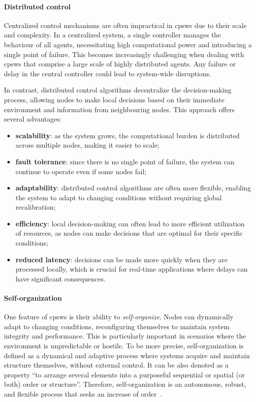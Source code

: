 \paragraph*{Distributed control}
Centralized control mechanisms are often impractical in \acp{cpsw} due to their scale and complexity. 
 In a centralized system, a single controller manages the behaviour of all agents, 
 necessitating high computational power and introducing a single point of failure. 
 This becomes increasingly challenging when dealing with \acp{cpsw} that comprise a large scale of highly distributed agents. 
 Any failure or delay in the central controller could lead to system-wide disruptions.

In contrast, distributed control algorithms decentralize the decision-making process, 
 allowing nodes to make local decisions based on their immediate environment and information from neighbouring nodes. 
 This approach offers several advantages:

\begin{itemize}
\item \textbf{scalability}: as the system grows, the computational burden is distributed across multiple nodes, making it easier to scale;
\item \textbf{fault tolerance}: since there is no single point of failure, the system can continue to operate even if some nodes fail;
\item \textbf{adaptability}: distributed control algorithms are often more flexible, 
 enabling the system to adapt to changing conditions without requiring global recalibration;
\item \textbf{efficiency}: local decision-making can often lead to more efficient utilization of resources, 
 as nodes can make decisions that are optimal for their specific conditions;
\item \textbf{reduced latency}: decisions can be made more quickly when they are processed locally, 
 which is crucial for real-time applications where delays can have significant consequences.
\end{itemize}
\paragraph*{Self-organization}
One feature of \acp{cpsw} is their ability to \emph{self-organize}. 
 Nodes can dynamically adapt to changing conditions, 
 reconfiguring themselves to maintain system integrity and performance.
% 
 This is particularly important in scenarios where the environment is unpredictable or hostile.
%
To be more precise, self-organization 
 is defined as a dynamical and adaptive process where systems acquire and maintain structure themselves, without external control. 
 It can be also denoted as a property ``to arrange several elements into a purposeful sequential or spatial (or both) order or structure''. 
 Therefore, self-organization is an autonomous, robust, and flexible process that seeks an increase of order~\cite{de2004emergence}.

